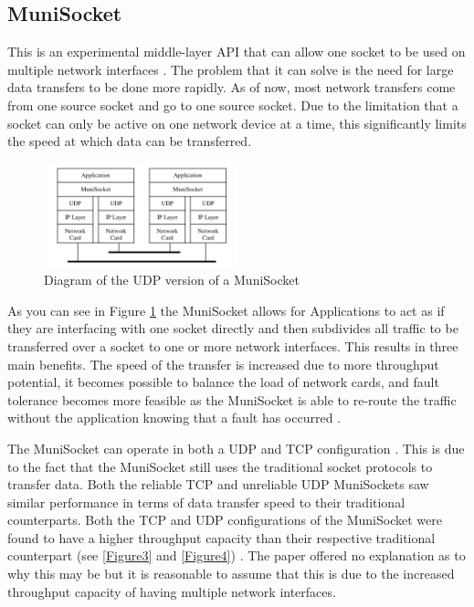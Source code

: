 \documentclass[conference, 12pt]{IEEEtran}
\begin{document}
\subsection{MuniSocket}
This is an experimental middle-layer API that can allow one socket to be used on multiple network interfaces \cite{Mohamed}. The problem that it can solve is the need for large data transfers to be done more rapidly. As of now, most network transfers come from one source socket and go to one source socket. Due to the limitation that a socket can only be active on one network device at a time, this significantly limits the speed at which data can be transferred.

\begin{figure}[htbp]
    \centering
    \centerline{\includegraphics[width=0.5\textwidth]{Figure2.png}}
    \caption{Diagram of the UDP version of a MuniSocket \cite{Mohamed}}
    \label{Figure2}
\end{figure}

As you can see in Figure \ref{Figure2} the MuniSocket allows for Applications to act as if they are interfacing with one socket directly and then subdivides all traffic to be transferred over a socket to one or more network interfaces. This results in three main benefits. The speed of the transfer is increased due to more throughput potential, it becomes possible to balance the load of network cards, and fault tolerance becomes more feasible as the MuniSocket is able to re-route the traffic without the application knowing that a fault has occurred \cite{Mohamed}.

The MuniSocket can operate in both a UDP and TCP configuration \cite{Mohamed}. This is due to the fact that the MuniSocket still uses the traditional socket protocols to transfer data. Both the reliable TCP and unreliable UDP MuniSockets saw similar performance in terms of data transfer speed to their traditional counterparts. Both the TCP and UDP configurations of the MuniSocket were found to have a higher throughput capacity than their respective traditional counterpart (see \ref{Figure3} and \ref{Figure4}) \cite{Mohamed}. The paper offered no explanation as to why this may be but it is reasonable to assume that this is due to the increased throughput capacity of having multiple network interfaces.
\end{document}

